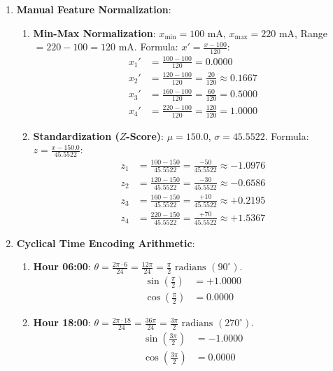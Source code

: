 \begin{enumerate}
    \item \textbf{Manual Feature Normalization}:
    \begin{enumerate}[label=(\alph*)]
        \item \textbf{Min-Max Normalization}:
        $x_{\min} = 100\text{ mA}$, $x_{\max} = 220\text{ mA}$, Range $= 220 - 100 = 120\text{ mA}$.
        Formula: $x' = \frac{x - 100}{120}$:
        \begin{align*}
        x_1' &= \frac{100 - 100}{120} = \mathbf{0.0000} \\
        x_2' &= \frac{120 - 100}{120} = \frac{20}{120} \approx \mathbf{0.1667} \\
        x_3' &= \frac{160 - 100}{120} = \frac{60}{120} = \mathbf{0.5000} \\
        x_4' &= \frac{220 - 100}{120} = \frac{120}{120} = \mathbf{1.0000}
        \end{align*}
        \item \textbf{Standardization ($Z$-Score)}:
        $\mu = 150.0$, $\sigma = 45.5522$.
        Formula: $z = \frac{x - 150.0}{45.5522}$:
        \begin{align*}
        z_1 &= \frac{100 - 150}{45.5522} = \frac{-50}{45.5522} \approx \mathbf{-1.0976} \\
        z_2 &= \frac{120 - 150}{45.5522} = \frac{-30}{45.5522} \approx \mathbf{-0.6586} \\
        z_3 &= \frac{160 - 150}{45.5522} = \frac{+10}{45.5522} \approx \mathbf{+0.2195} \\
        z_4 &= \frac{220 - 150}{45.5522} = \frac{+70}{45.5522} \approx \mathbf{+1.5367}
        \end{align*}
    \end{enumerate}

    \item \textbf{Cyclical Time Encoding Arithmetic}:
    \begin{enumerate}[label=(\alph*)]
        \item \textbf{Hour 06:00}:
        $\theta = \frac{2\pi \cdot 6}{24} = \frac{12\pi}{24} = \frac{\pi}{2} \text{ radians } (90^\circ)$.
        \begin{align*}
        \sin\left(\frac{\pi}{2}\right) &= \mathbf{+1.0000} \\
        \cos\left(\frac{\pi}{2}\right) &= \mathbf{0.0000}
        \end{align*}
        \item \textbf{Hour 18:00}:
        $\theta = \frac{2\pi \cdot 18}{24} = \frac{36\pi}{24} = \frac{3\pi}{2} \text{ radians } (270^\circ)$.
        \begin{align*}
        \sin\left(\frac{3\pi}{2}\right) &= \mathbf{-1.0000} \\
        \cos\left(\frac{3\pi}{2}\right) &= \mathbf{0.0000}
        \end{align*}
    \end{enumerate}


\end{enumerate}
